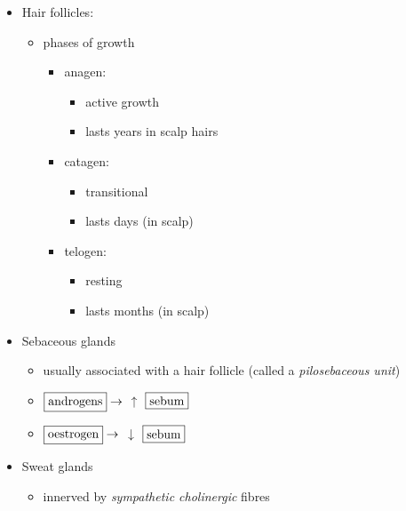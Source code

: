 \documentclass[
  12pt,
]{memoir}
\providecommand{\tightlist}{%
  \setlength{\itemsep}{0pt}\setlength{\parskip}{0pt}}
\begin{document}
\begin{itemize}
\tightlist
\item
  Hair follicles:

  \begin{itemize}
  \tightlist
  \item
    phases of growth

    \begin{itemize}
    \tightlist
    \item
      anagen:

      \begin{itemize}
      \tightlist
      \item
        active growth
      \item
        lasts years in scalp hairs
      \end{itemize}
    \item
      catagen:

      \begin{itemize}
      \tightlist
      \item
        transitional
      \item
        lasts days (in scalp)
      \end{itemize}
    \item
      telogen:

      \begin{itemize}
      \tightlist
      \item
        resting
      \item
        lasts months (in scalp)
      \end{itemize}
    \end{itemize}
  \end{itemize}
\item
  Sebaceous glands

  \begin{itemize}
  \tightlist
  \item
    usually associated with a hair follicle (called a
    \emph{pilosebaceous unit})
  \item
    \(\fbox{androgens}\rightarrow\) \textbf{\(\uparrow\)}
    \(\fbox{sebum}\)
  \item
    \(\fbox{oestrogen}\rightarrow\) \textbf{\(\downarrow\)}
    \(\fbox{sebum}\)
  \end{itemize}
\item
  Sweat glands

  \begin{itemize}
  \tightlist
  \item
    innerved by \emph{sympathetic cholinergic} fibres
  \end{itemize}
\end{itemize}
\end{document}
